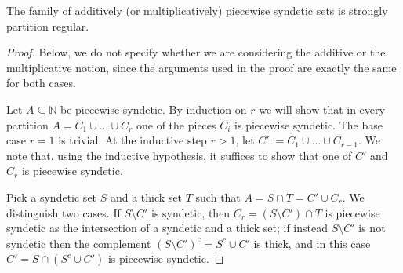 \documentclass[10pt,a4paper]{amsart}
\newcommand{\N}{\mathbb{N}}
\begin{document}
\begin{proposition}\label{PRofPS} 
The family of additively (or multiplicatively) piecewise syndetic sets
is strongly partition regular.
\end{proposition}

\begin{proof} 
Below, we do not specify whether we are considering the additive or the multiplicative notion, 
since the arguments used in the proof are exactly the same for both cases.

Let $A\subseteq\N$ be piecewise syndetic.
By induction on $r$ we will show that in every
partition $A=C_1\cup\ldots\cup C_r$ one of the pieces $C_i$ is piecewise syndetic.
The base case $r=1$ is trivial.
At the inductive step $r>1$, let $C':=C_1\cup\ldots\cup C_{r-1}$.
We note that, using the inductive hypothesis, it suffices to show that one 
of $C'$ and $C_r$ is piecewise syndetic.

Pick a syndetic set $S$ and a thick set $T$ such that $A=S\cap T=C'\cup C_r$.
We distinguish two cases.
If $S\setminus C'$ is syndetic, then 
$C_r=(S\setminus C')\cap T$ is piecewise syndetic as the intersection of a syndetic and a thick set;
if instead $S\setminus C'$ is not syndetic then the complement 
$(S\setminus C')^c=S^c\cup C'$ is thick, and in this case
$C'=S\cap(S^c\cup C')$ is piecewise syndetic.
\end{proof}
\end{document}

